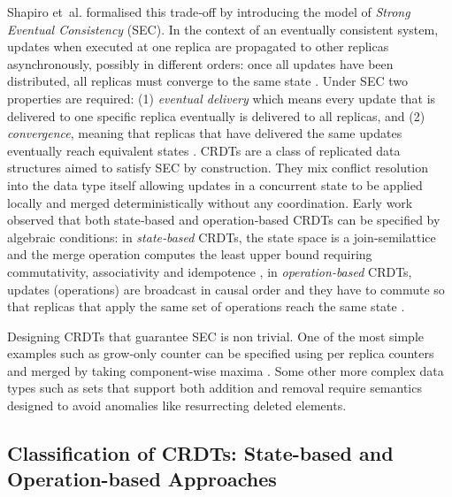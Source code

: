 Shapiro et~al. formalised this trade‐off by introducing the model of \emph{Strong Eventual Consistency} (SEC). In the context of an eventually consistent system, updates when executed at one replica are propagated to other replicas asynchronously, possibly in different orders: once all updates have been distributed, all replicas must converge to the same state \cite{shapiro2011conflict}. Under SEC two properties are required: (1) \emph{eventual delivery} which means every update that is delivered to one specific replica eventually is delivered to all replicas, and (2) \emph{convergence}, meaning that replicas that have delivered the same updates eventually reach equivalent states \cite{nieto2022modular}. CRDTs are a class of replicated data structures aimed to satisfy SEC by construction. They mix conflict resolution into the data type itself allowing updates in a concurrent state to be applied locally and merged deterministically without any coordination. Early work observed that both state‐based and operation‐based CRDTs can be specified by algebraic conditions: in \emph{state‐based} CRDTs, the state space is a join‐semilattice and the merge operation computes the least upper bound requiring commutativity, associativity and idempotence \cite{zeller2014formal,shapiro2011conflict}, in \emph{operation‐based} CRDTs, updates (operations) are broadcast in causal order and they have to commute so that replicas that apply the same set of operations reach the same state \cite{nieto2022modular}.

Designing CRDTs that guarantee SEC is non trivial. One of the most simple examples such as grow‐only counter can be specified using per replica counters and merged by taking component-wise maxima \cite{zeller2014formal}. Some other more complex data types such as sets that support both addition and removal require semantics designed to avoid anomalies like resurrecting deleted elements.

\subsection{Classification of CRDTs: State-based and Operation-based Approaches}

